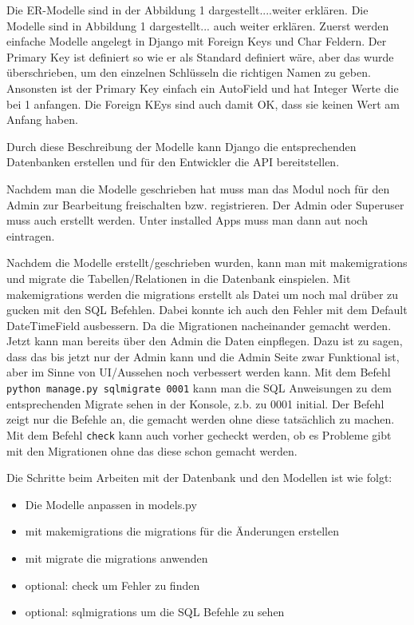 \documentclass[11pt,a4paper]{report}
\begin{document}
Die ER-Modelle sind in der Abbildung 1 dargestellt....weiter erklären. Die Modelle sind in Abbildung 1 dargestellt... auch weiter erklären. Zuerst werden einfache Modelle angelegt in Django mit Foreign Keys und Char Feldern. Der Primary Key ist definiert so wie er als Standard definiert wäre, aber das wurde überschrieben, um den einzelnen Schlüsseln die richtigen Namen zu geben. Ansonsten ist der Primary Key einfach ein AutoField und hat Integer Werte die bei 1 anfangen. Die Foreign KEys sind auch damit OK, dass sie keinen Wert am Anfang haben. 

Durch diese Beschreibung der Modelle kann Django die entsprechenden Datenbanken erstellen und für den Entwickler die API bereitstellen.

Nachdem man die Modelle geschrieben hat muss man das Modul noch für den Admin zur Bearbeitung freischalten bzw. registrieren. Der Admin oder Superuser muss auch erstellt werden. Unter installed Apps muss man dann aut noch eintragen.


Nachdem die Modelle erstellt/geschrieben wurden, kann man mit makemigrations und migrate die Tabellen/Relationen in die Datenbank einspielen. Mit makemigrations werden die migrations erstellt als Datei um noch mal drüber zu gucken mit den SQL Befehlen. Dabei konnte ich auch den Fehler mit dem Default DateTimeField ausbessern. Da die Migrationen nacheinander gemacht werden. Jetzt kann man bereits über den Admin die Daten einpflegen. Dazu ist zu sagen, dass das bis jetzt nur der Admin kann und die Admin Seite zwar Funktional ist, aber im Sinne von UI/Aussehen noch verbessert werden kann. Mit dem Befehl \verb|python manage.py sqlmigrate 0001| kann man die SQL Anweisungen zu dem entsprechenden Migrate sehen in der Konsole, z.b. zu 0001 initial. Der Befehl zeigt nur die Befehle an, die gemacht werden ohne diese tatsächlich zu machen.
Mit dem Befehl \verb|check| kann auch vorher gecheckt werden, ob es Probleme gibt mit den Migrationen ohne das diese schon gemacht werden.


Die Schritte beim Arbeiten mit der Datenbank und den Modellen ist wie folgt:
\begin{itemize}
\item Die Modelle anpassen in models.py
\item mit makemigrations die migrations für die Änderungen erstellen
\item mit migrate die migrations anwenden
\item optional: check um Fehler zu finden
\item optional: sqlmigrations um die SQL Befehle zu sehen
\end{itemize}
\end{document}
